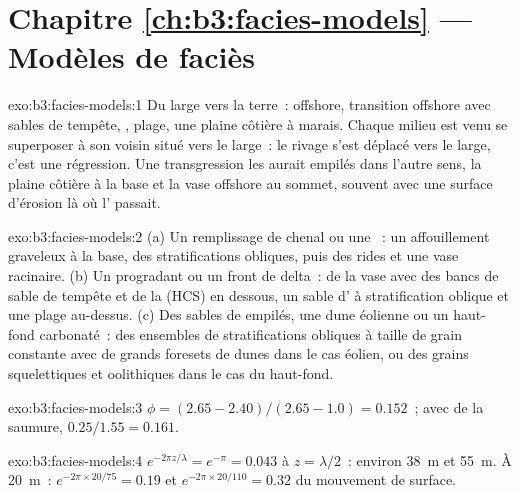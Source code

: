 \section*{Chapitre \ref{ch:b3:facies-models} --- Modèles de faciès}

\begin{solution}{exo:b3:facies-models:1}
Du large vers la terre~: offshore, transition offshore avec sables de tempête,
, plage, une plaine côtière à marais. Chaque milieu est venu se
superposer à son voisin situé vers le large~: le rivage s'est déplacé vers le large, c'est une régression. Une
transgression les aurait empilés dans l'autre sens, la plaine côtière à la
base et la vase offshore au sommet, souvent avec une surface d'érosion là où
l' passait.
\end{solution}

\begin{solution}{exo:b3:facies-models:2}
(a) Un remplissage de chenal ou une ~: un affouillement graveleux à la base, des stratifications obliques,
puis des rides et une vase racinaire. (b) Un  progradant ou un front de delta~:
de la vase avec des bancs de sable de tempête et de la  (HCS) en dessous,
un sable d' à stratification oblique et une plage au-dessus. (c) Des sables
de  empilés, une dune éolienne ou un haut-fond carbonaté~: des ensembles de stratifications obliques à taille de grain constante
avec de grands foresets de dunes dans le cas éolien, ou des
grains squelettiques et oolithiques dans le cas du haut-fond.
\end{solution}

\begin{solution}{exo:b3:facies-models:3}
$\phi = (2.65 - 2.40)/(2.65 - 1.0) = 0.152$~; avec de la saumure,
$0.25/1.55 = 0.161$.
\end{solution}

\begin{solution}{exo:b3:facies-models:4}
$e^{-2\pi z/\lambda} = e^{-\pi} = 0.043$ à $z = \lambda/2$~: environ
\qty{38}{m} et \qty{55}{m}. À \qty{20}{m}~: $e^{-2\pi\times20/75} = 0.19$
et $e^{-2\pi\times20/110} = 0.32$ du mouvement de surface.
\end{solution}


